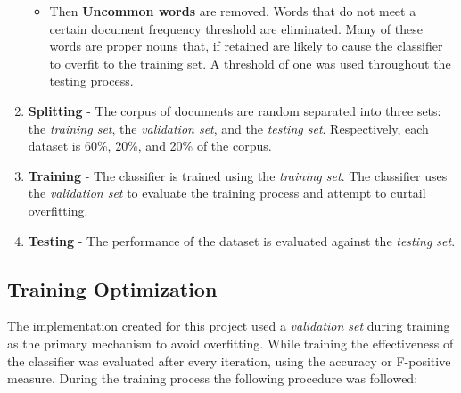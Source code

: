 \documentclass[final,3p,12pt]{elsarticle}
\begin{document}
\begin{enumerate}
\begin{itemize}
            \item Then \textbf{Uncommon words} are removed. Words that do not
                meet a certain document frequency threshold are eliminated.
                Many of these words are proper nouns that, if retained are
                likely to cause the classifier to overfit to the training set.
                A threshold of one was used throughout the testing process.

        \end{itemize}

    \item \textbf{Splitting} - The corpus of documents are random separated
        into three sets: the \textit{training set}, the \textit{validation set},
        and the \textit{testing set}. Respectively, each dataset is 60\%, 20\%,
        and 20\% of the corpus.

    \item \textbf{Training} - The classifier is trained using the
        \textit{training set}.  The classifier uses the \textit{validation set}
        to evaluate the training process and attempt to curtail overfitting.

    \item \textbf{Testing} - The performance of the dataset is evaluated
        against the \textit{testing set}.

\end{enumerate}


\subsection{Training Optimization}
\label{ssection:optimization}

The implementation created for this project used a \textit{validation set} during
training as the primary mechanism to avoid overfitting. While training the
effectiveness of the classifier was evaluated after every iteration, using the
accuracy or F-positive measure. During the training process the following
procedure was followed:
\end{document}
